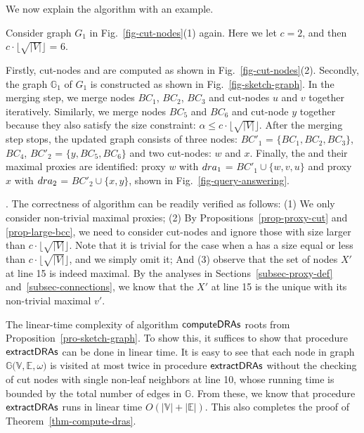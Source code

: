 We now explain the algorithm with an example.

\vspace{-0.5ex}
\begin{example}
\label{exm-compute-proxies} Consider graph $G_1$ in Fig.~\ref{fig-cut-nodes}(1) again. Here we let $c = 2$, and then $c\cdot\lfloor\sqrt{|V|}\rfloor$ = $6$.

Firstly, cut-nodes and \bccs are computed as shown in Fig.~\ref{fig-cut-nodes}(2).
Secondly, the \bcsketch graph $\mathbb{G}_1$ of $G_1$ is constructed as shown in Fig.~\ref{fig-sketch-graph}. In the merging step, we merge \bc nodes $BC_1$, $BC_2$, $BC_3$ and cut-nodes $u$ and $v$ together iteratively. Similarly, we merge \bc nodes $BC_5$ and $BC_6$ and cut-node $y$ together because they also satisfy the size constraint: $\alpha \leq c\cdot\lfloor\sqrt{|V|}\rfloor$.
After the merging step stops, the updated \bcsketch graph consists of three \bc nodes:
$BC'_1$ = $\{BC_1, BC_2, BC_3\}$, $BC_4$, $BC'_2$ = $\{y, BC_5, BC_6\}$ and two cut-nodes: $w$ and $x$.
Finally, the \dras and their maximal proxies are identified: proxy $w$ with ${\sc dra}_1$ = $BC'_1\cup\{w, v, u\}$ and proxy $x$ with  ${\sc dra}_2$ = $BC'_2\cup\{x, y\}$, shown in Fig.~\ref{fig-query-answering}.
\end{example}
\vspace{-0.5ex}

\vspace{-1ex}
. The correctness of algorithm \compDRAs can be readily verified as follows:
(1) We only consider non-trivial maximal proxies; (2) By Propositions~\ref{prop-proxy-cut} and \ref{prop-large-bcc}, we need to consider cut-nodes and ignore those \bccs with size larger than $c\cdot\lfloor\sqrt{|V|}\rfloor$. Note that it is trivial for the case when a \cc has a size equal or less than $c\cdot\lfloor\sqrt{|V|}\rfloor$, and we simply omit it; And (3) observe that the set of nodes $X'$ at line 15 is indeed maximal. By the analyses in Sections~\ref{subsec-proxy-def} and~\ref{subsec-connections}, we know that the $X'$ at line 15 is the unique \dra with its non-trivial  maximal $v'$.


The linear-time complexity of algorithm ${\mathsf{computeDRAs}}$ roots from Proposition~\ref{pro-sketch-graph}.
To show this, it suffices to show that procedure ${\mathsf{extractDRAs}}$ can be done in linear time.
It is easy to see that each node in \bcsketch graph $\mathbb{G(V, E}, \omega)$ is visited at most twice in procedure ${\mathsf{extractDRAs}}$ without the checking of cut nodes with single non-leaf neighbors at line 10, whose running time is bounded by the total number of edges in $\mathbb{G}$.
From these, we know that procedure ${\mathsf{extractDRAs}}$ runs in linear time $O(|\mathbb{V}|+|\mathbb{E}|)$.
%
This also completes the proof of Theorem~\ref{thm-compute-dras}.


